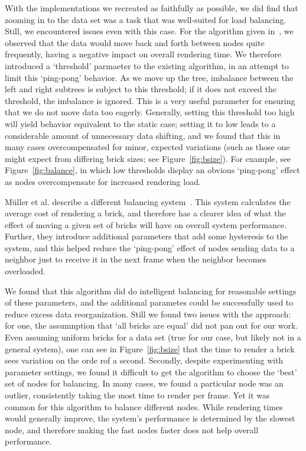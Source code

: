 With the implementations we recreated as faithfully as possible, we did
find that zooming in to the data set was a task that was well-suited
for load balancing.  Still, we encountered issues even with this case.
For the
algorithm given in~\cite{Marchesin:2006:???}, we observed that the
data would move back and forth between nodes quite frequently, having
a negative impact on overall rendering time.  We therefore introduced
a `threshold' parmaeter to the existing algorithm, in an attempt to
limit this `ping-pong' behavior.  As we move up the tree, imbalance
between the left and right subtrees is subject to this threshold; if
it does not exceed the threshold, the imbalance is ignored.  This
is a very useful parameter for ensuring that we do not move data
too eagerly.  Generally, setting this threshold too high will yield
behavior equivalent to the static case; setting it to low leads to a
considerable amount of unnecessary data shifting, and we found that
this in many cases overcompensated for minor, expected variations (such
as those one might expect
from differing brick sizes; see Figure~\ref{fig:bsize}).  For example,
see
Figure~\ref{fig:balance}, in which low thresholds display an obvious
`ping-pong' effect as nodes overcompensate for increased rendering
load.

M\"uller et al. describe a different balancing system~\cite{MSE06}.
This system calculates the average cost of rendering a brick, and
therefore has a clearer idea of what the effect of moving a given set
of bricks will have on overall system performance.  Further, they
introduce additional parameters that add some hysteresis to the system,
and this helped reduce the `ping-pong' effect of nodes sending data
to a neighbor just to receive it in the next frame when the neighbor
becomes overloaded.

We found that this algorithm did do intelligent balancing for
reasonable settings of these parameters, and the additional parametes
could be successfully used to reduce excess data reorganization.  Still
we found two issues with the approach: for one, the assumnption that
`all bricks are equal' did not pan out for our work.  Even assuming
uniform bricks for a data set (true for our case, but likely not in a
general system), one can see in
Figure~\ref{fig:bsize} that the time to render a brick sees variation
on the orde rof a second.  Secondly, despite experimenting with
parameter settings, we found it difficult to get the algorithm to
choose the `best' set of nodes for balancing.  In many cases, we found
a particular node was an outlier, consistently taking the most time
to render per frame.  Yet it was common for this algorithm to balance
different nodes.  While rendering times would generally improve, the
system's performance is determined by the slowest node, and therefore
making the fast nodes faster does not help overall performance.

